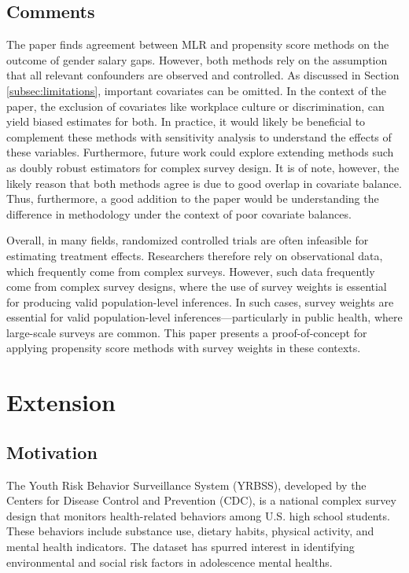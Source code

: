 \documentclass[12pt]{article}
\begin{document}
\subsection{Comments} \label{subsec:finalcomments}

The paper finds agreement between MLR and propensity score methods on the outcome of gender salary gaps. However, both methods rely on the assumption that all relevant confounders are observed and controlled. As discussed in Section \ref{subsec:limitations}, important covariates can be omitted. In the context of the paper, the exclusion of covariates like workplace culture or discrimination, can yield biased estimates for both. In practice, it would likely be beneficial to complement these methods with sensitivity analysis to understand the effects of these variables. Furthermore, future work could explore extending methods such as doubly robust estimators for complex survey design. It is of note, however, the likely reason that both methods agree is due to good overlap in covariate balance. Thus, furthermore, a good addition to the paper would be understanding the difference in methodology under the context of poor covariate balances. 

Overall, in many fields, randomized controlled trials are often infeasible for estimating treatment effects. Researchers therefore rely on observational data, which frequently come from complex surveys. However, such data frequently come from complex survey designs, where the use of survey weights is essential for producing valid population-level inferences. In such cases, survey weights are essential for valid population-level inferences—particularly in public health, where large-scale surveys are common. This paper presents a proof-of-concept for applying propensity score methods with survey weights in these contexts.

\section{Extension} \label{sec:Extension}

\subsection{Motivation} \label{subsec:ExtMotivation}

The Youth Risk Behavior Surveillance System (YRBSS), developed by the Centers for Disease Control and Prevention (CDC), is a national complex survey design that monitors health-related behaviors among U.S. high school students. These behaviors include substance use, dietary habits, physical activity, and mental health indicators. The dataset has spurred interest in identifying environmental and social risk factors in adolescence mental healths. 
\end{document}
